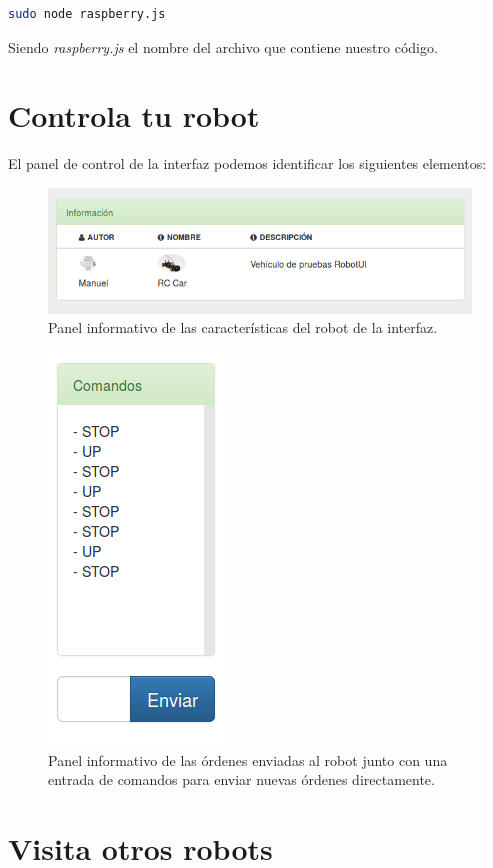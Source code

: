 \begin{lstlisting}[language=bash]
  sudo node raspberry.js
\end{lstlisting}

Siendo \emph{raspberry.js} el nombre del archivo que contiene nuestro código.


\section{ Controla tu robot }
\label{sec:control-robot}

El panel de control de la interfaz podemos identificar los siguientes elementos:

\begin{figure}[H]
  \begin{center}
    \includegraphics[scale=.6]{imagenes/manual-usuario/panel-robot-info.png}
  \end{center}
  \caption{ Panel informativo de las características del robot de la interfaz.}
  \label{website:pagina-principal}
\end{figure}


\begin{figure}[H]
  \begin{center}
    \includegraphics[scale=.6]{imagenes/manual-usuario/panel-comandos.png}
  \end{center}
  \caption{ Panel informativo de las órdenes enviadas al robot junto con una entrada de comandos para enviar nuevas órdenes directamente.}
  \label{website:pagina-principal}
\end{figure}


\section{ Visita otros robots }
\label{sec:visita-robot}


